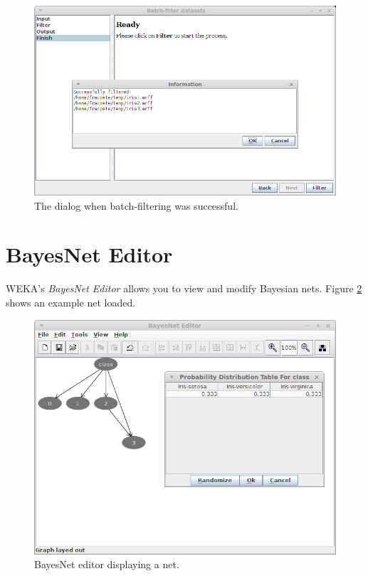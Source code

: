 \begin{figure}[htb]
  \centering
  \includegraphics[width=12.0cm]{images/batchfilter_datasets4.png}
  \caption{The dialog when batch-filtering was successful.}
  \label{batchfilter_datasets4}
\end{figure}

\clearpage
\section{BayesNet Editor}
WEKA's \textit{BayesNet Editor} allows you to view and modify Bayesian nets.
Figure \ref{bayesnet_editor} shows an example net loaded.

\begin{figure}[htb]
  \centering
  \includegraphics[width=12.0cm]{images/bayesnet_editor.png}
  \caption{BayesNet editor displaying a net.}
  \label{bayesnet_editor}
\end{figure}

\clearpage
